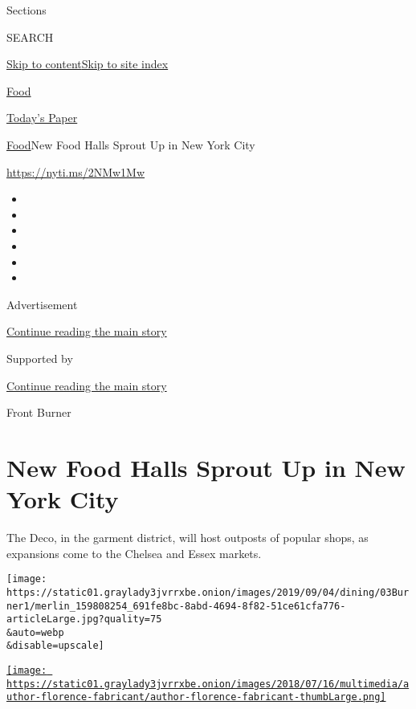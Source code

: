 Sections

SEARCH

\protect\hyperlink{site-content}{Skip to
content}\protect\hyperlink{site-index}{Skip to site index}

\href{https://www.nytimes3xbfgragh.onion/section/food}{Food}

\href{https://myaccount.nytimes3xbfgragh.onion/auth/login?response_type=cookie\&client_id=vi}{}

\href{https://www.nytimes3xbfgragh.onion/section/todayspaper}{Today's
Paper}

\href{/section/food}{Food}\textbar{}New Food Halls Sprout Up in New York
City

\url{https://nyti.ms/2NMw1Mw}

\begin{itemize}
\item
\item
\item
\item
\item
\item
\end{itemize}

Advertisement

\protect\hyperlink{after-top}{Continue reading the main story}

Supported by

\protect\hyperlink{after-sponsor}{Continue reading the main story}

Front Burner

\hypertarget{new-food-halls-sprout-up-in-new-york-city}{%
\section{New Food Halls Sprout Up in New York
City}\label{new-food-halls-sprout-up-in-new-york-city}}

The Deco, in the garment district, will host outposts of popular shops,
as expansions come to the Chelsea and Essex markets.

\texttt{[image: https://static01.graylady3jvrrxbe.onion/images/2019/09/04/dining/03Burner1/merlin\_159808254\_691fe8bc-8abd-4694-8f82-51ce61cfa776-articleLarge.jpg?quality=75\\\&auto=webp\\\&disable=upscale]}

\href{https://www.nytimes3xbfgragh.onion/by/florence-fabricant}{\texttt{[image: https://static01.graylady3jvrrxbe.onion/images/2018/07/16/multimedia/author-florence-fabricant/author-florence-fabricant-thumbLarge.png]}}

